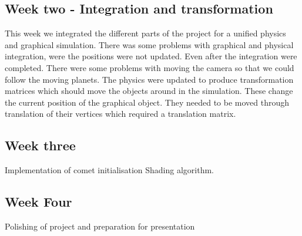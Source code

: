 \subsection{Week two - Integration and transformation}
This week we integrated the different parts of the project for a unified physics and graphical simulation. There was some problems with graphical and physical integration, were the positions were not updated. 
Even after the integration were completed. There were some problems with moving the camera so that we could follow the moving planets. 
The physics were updated to produce transformation matrices which should move the objects around in the simulation. These change the current position of the graphical object. They needed to be moved through translation of their vertices which required a translation matrix.
\subsection{Week three}
Implementation of comet initialisation
Shading algorithm.

\subsection{Week Four}
Polishing of project and preparation for presentation
\textsl{}